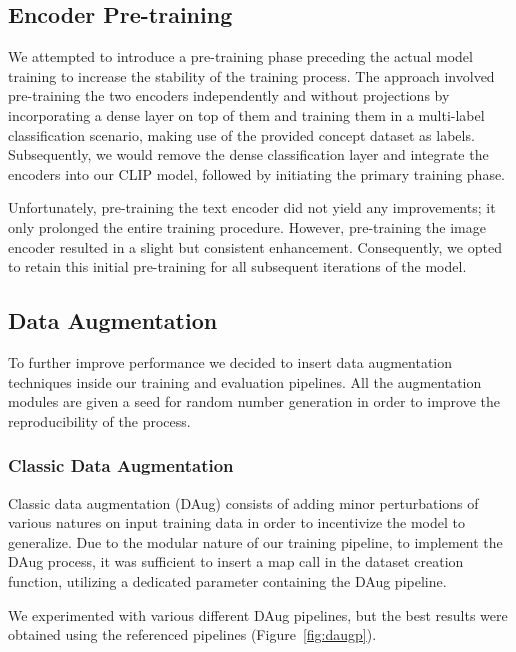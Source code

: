 \documentclass[10pt,twocolumn,letterpaper]{article}
\begin{document}
\subsection{Encoder Pre-training}
We attempted to introduce a pre-training phase preceding the actual model training to increase the stability of the training process.
The approach involved pre-training the two encoders independently and without projections by incorporating a dense layer on top of them and training them in a multi-label classification scenario, making use of the provided concept dataset as labels. Subsequently, we would remove the dense classification layer and integrate the encoders into our CLIP model, followed by initiating the primary training phase.

Unfortunately, pre-training the text encoder did not yield any improvements; it only prolonged the entire training procedure. However, pre-training the image encoder resulted in a slight but consistent enhancement. Consequently, we opted to retain this initial pre-training for all subsequent iterations of the model.

\subsection{Data Augmentation}
To further improve performance we decided to insert data augmentation techniques inside our training and evaluation pipelines.
All the augmentation modules are given a seed for random number generation in order to improve the reproducibility of the process.

\subsubsection{Classic Data Augmentation}
Classic data augmentation (DAug) consists of adding minor perturbations of various natures on input training data in order to incentivize the model to generalize.
Due to the modular nature of our training pipeline, to implement the DAug process, it was sufficient to insert a map call in the dataset creation function, utilizing a dedicated parameter containing the DAug pipeline.

We experimented with various different DAug pipelines, but the best results were obtained using the referenced pipelines (Figure\ \ref{fig:daugp}).
\end{document}
